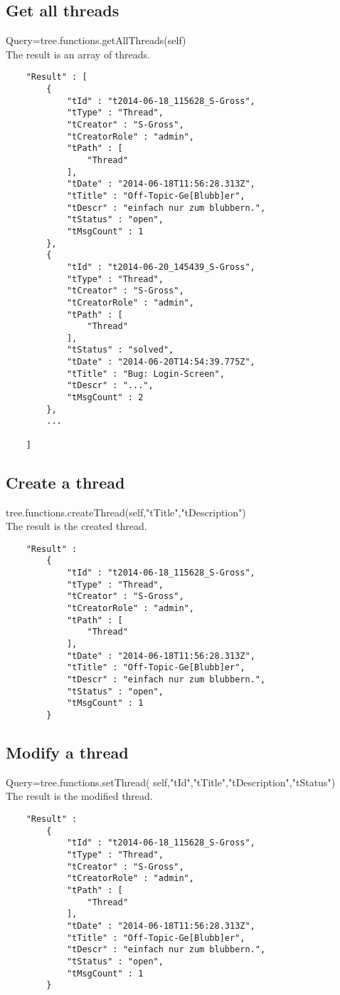 \documentclass[12pt,a4paper,oneside]{report}
\begin{document}
\subsection{Get all threads}
Query=tree.functions.getAllThreads(self)\\
The result is an array of threads.
\begin{lstlisting}
    "Result" : [  
        { 
            "tId" : "t2014-06-18_115628_S-Gross",
            "tType" : "Thread",
            "tCreator" : "S-Gross",
            "tCreatorRole" : "admin",
            "tPath" : [  
                "Thread"
            ],
            "tDate" : "2014-06-18T11:56:28.313Z",
            "tTitle" : "Off-Topic-Ge[Blubb]er",
            "tDescr" : "einfach nur zum blubbern.",
            "tStatus" : "open",
            "tMsgCount" : 1
        },
        { 
            "tId" : "t2014-06-20_145439_S-Gross",
            "tType" : "Thread",
            "tCreator" : "S-Gross",
            "tCreatorRole" : "admin",
            "tPath" : [  
                "Thread"
            ],
            "tStatus" : "solved",
            "tDate" : "2014-06-20T14:54:39.775Z",
            "tTitle" : "Bug: Login-Screen",
            "tDescr" : "...",
            "tMsgCount" : 2
        },
        ...
        
    ]
\end{lstlisting}
\clearpage
\subsection{Create a thread}
tree.functions.createThread(self,"tTitle","tDescription")\\
The result is the created thread.
\begin{lstlisting}
    "Result" : 
    	{ 
            "tId" : "t2014-06-18_115628_S-Gross",
            "tType" : "Thread",
            "tCreator" : "S-Gross",
            "tCreatorRole" : "admin",
            "tPath" : [  
                "Thread"
            ],
            "tDate" : "2014-06-18T11:56:28.313Z",
            "tTitle" : "Off-Topic-Ge[Blubb]er",
            "tDescr" : "einfach nur zum blubbern.",
            "tStatus" : "open",
            "tMsgCount" : 1
        }
\end{lstlisting}

\subsection{Modify a thread}
Query=tree.functions.setThread( self,"tId","tTitle","tDescription","tStatus")
\\The result is the modified thread.
\begin{lstlisting}
    "Result" : 
    	{ 
            "tId" : "t2014-06-18_115628_S-Gross",
            "tType" : "Thread",
            "tCreator" : "S-Gross",
            "tCreatorRole" : "admin",
            "tPath" : [  
                "Thread"
            ],
            "tDate" : "2014-06-18T11:56:28.313Z",
            "tTitle" : "Off-Topic-Ge[Blubb]er",
            "tDescr" : "einfach nur zum blubbern.",
            "tStatus" : "open",
            "tMsgCount" : 1
        }
\end{lstlisting}
\end{document}
